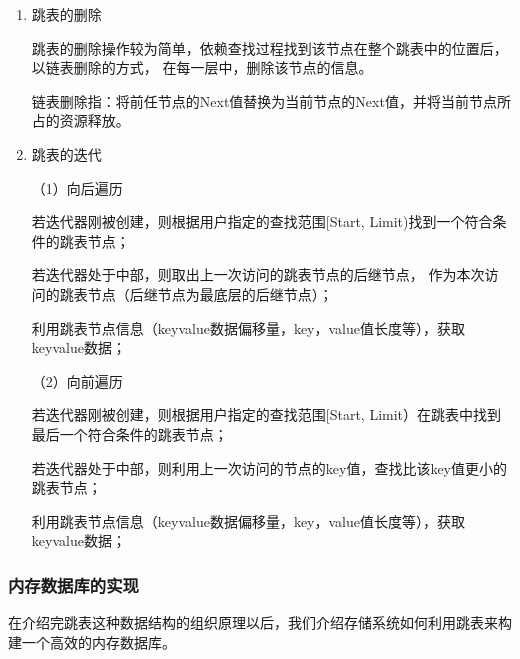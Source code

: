 \begin{enumerate}
		\item 跳表的删除

		跳表的删除操作较为简单，依赖查找过程找到该节点在整个跳表中的位置后，以链表删除的方式，
		在每一层中，删除该节点的信息。

		链表删除指：将前任节点的Next值替换为当前节点的Next值，并将当前节点所占的资源释放。

		\item 跳表的迭代
		
		（1）向后遍历

		若迭代器刚被创建，则根据用户指定的查找范围[Start, Limit)找到一个符合条件的跳表节点；
		
		若迭代器处于中部，则取出上一次访问的跳表节点的后继节点，
		作为本次访问的跳表节点（后继节点为最底层的后继节点）；
		
		利用跳表节点信息（keyvalue数据偏移量，key，value值长度等），获取keyvalue数据；
		
		（2）向前遍历

		若迭代器刚被创建，则根据用户指定的查找范围[Start, Limit）在跳表中找到最后一个符合条件的跳表节点；
		
		若迭代器处于中部，则利用上一次访问的节点的key值，查找比该key值更小的跳表节点；
		
		利用跳表节点信息（keyvalue数据偏移量，key，value值长度等），获取keyvalue数据；

	\end{enumerate}

		\subsubsection{内存数据库的实现}

		在介绍完跳表这种数据结构的组织原理以后，我们介绍存储系统如何利用跳表来构建一个高效的内存数据库。

